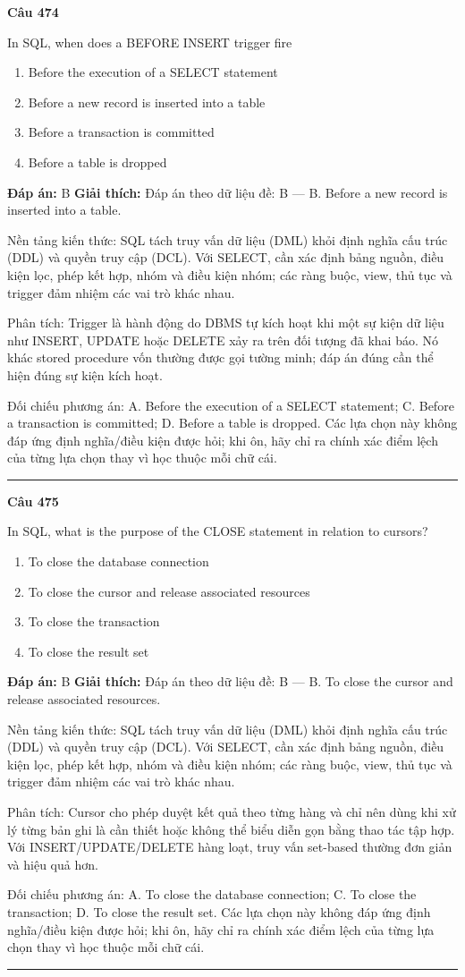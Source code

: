 \documentclass[11pt,a4paper]{article}
\newenvironment{question}[1]{%
  \par\vspace{1em}\noindent\textbf{\large Câu #1}\par\vspace{0.4em}
}{%
  \par\vspace{1em}\hrule\vspace{0.6em}
}
\newenvironment{choices}{%
  \begin{enumerate}[label=\textbf{\Alph*.},leftmargin=2.2em,itemsep=2pt,topsep=3pt]
}{%
  \end{enumerate}
}
\newcommand{\choice}{\item}
\begin{document}
\begin{question}{474}
In SQL, when does a BEFORE INSERT trigger fire
\begin{choices}
\choice Before the execution of a SELECT statement
\choice Before a new record is inserted into a table
\choice Before a transaction is committed
\choice Before a table is dropped
\end{choices}
\textbf{Đáp án:} B
\textbf{Giải thích:} Đáp án theo dữ liệu đề: B — B. Before a new record is inserted into a table.

Nền tảng kiến thức: SQL tách truy vấn dữ liệu (DML) khỏi định nghĩa cấu trúc (DDL) và quyền truy cập (DCL). Với SELECT, cần xác định bảng nguồn, điều kiện lọc, phép kết hợp, nhóm và điều kiện nhóm; các ràng buộc, view, thủ tục và trigger đảm nhiệm các vai trò khác nhau.

Phân tích: Trigger là hành động do DBMS tự kích hoạt khi một sự kiện dữ liệu như INSERT, UPDATE hoặc DELETE xảy ra trên đối tượng đã khai báo. Nó khác stored procedure vốn thường được gọi tường minh; đáp án đúng cần thể hiện đúng sự kiện kích hoạt.

Đối chiếu phương án: A. Before the execution of a SELECT statement; C. Before a transaction is committed; D. Before a table is dropped. Các lựa chọn này không đáp ứng định nghĩa/điều kiện được hỏi; khi ôn, hãy chỉ ra chính xác điểm lệch của từng lựa chọn thay vì học thuộc mỗi chữ cái.
\end{question}

\begin{question}{475}
In SQL, what is the purpose of the CLOSE statement in relation to cursors?
\begin{choices}
\choice To close the database connection
\choice To close the cursor and release associated resources
\choice To close the transaction
\choice To close the result set
\end{choices}
\textbf{Đáp án:} B
\textbf{Giải thích:} Đáp án theo dữ liệu đề: B — B. To close the cursor and release associated resources.

Nền tảng kiến thức: SQL tách truy vấn dữ liệu (DML) khỏi định nghĩa cấu trúc (DDL) và quyền truy cập (DCL). Với SELECT, cần xác định bảng nguồn, điều kiện lọc, phép kết hợp, nhóm và điều kiện nhóm; các ràng buộc, view, thủ tục và trigger đảm nhiệm các vai trò khác nhau.

Phân tích: Cursor cho phép duyệt kết quả theo từng hàng và chỉ nên dùng khi xử lý từng bản ghi là cần thiết hoặc không thể biểu diễn gọn bằng thao tác tập hợp. Với INSERT/UPDATE/DELETE hàng loạt, truy vấn set-based thường đơn giản và hiệu quả hơn.

Đối chiếu phương án: A. To close the database connection; C. To close the transaction; D. To close the result set. Các lựa chọn này không đáp ứng định nghĩa/điều kiện được hỏi; khi ôn, hãy chỉ ra chính xác điểm lệch của từng lựa chọn thay vì học thuộc mỗi chữ cái.
\end{question}
\end{document}
